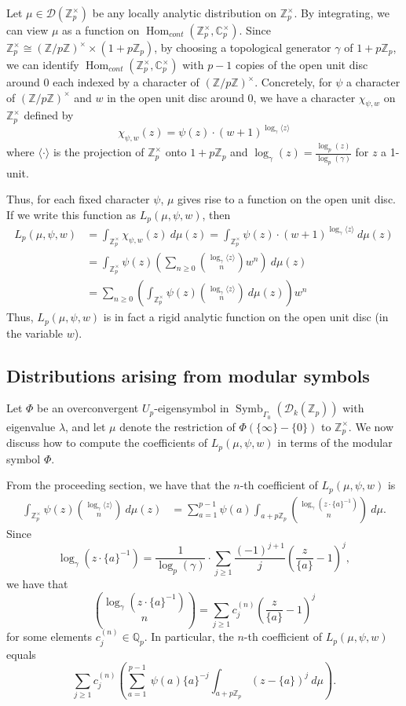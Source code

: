 \documentclass{amsart}
\theoremstyle{plain}
\theoremstyle{definition}
\newcommand{\D}{{\mathcal D}}
\newcommand{\Z}{{\mathbb Z}}
\newcommand{\Q}{{\mathbb Q}}
\newcommand{\C}{{\mathbb C}}
\newcommand{\Zp}{\Z_p}
\newcommand{\Zpx}{\Z_p^\times}
\newcommand{\Cpx}{\C_p^\times}
\newcommand{\Qp}{\Q_p}
\renewcommand{\binom}[2]{\genfrac{(}{)}{0pt}{}{#1}{#2}}
\newcommand{\Dvla}[1]{\D_{#1}(\Zp)}
\newcommand{\Dkla}{\Dvla{k}}
\DeclareMathOperator{\Hom}{Hom}
\DeclareMathOperator{\Symb}{Symb}
\newcommand{\MSo}[1]{\Symb_{\Gamma_0}(#1)}
\begin{document}
Let $\mu \in \D(\Zpx)$ be any locally analytic distribution on $\Zpx$.  By integrating, we can view $\mu$ as a function on $\Hom_{cont}(\Zpx,\Cpx)$.  Since $\Zpx \cong (\Z/p\Z)^\times \times (1+p\Zp)$, by choosing a topological generator $\gamma$ of $1+p\Zp$, we can identify $\Hom_{cont}(\Zpx,\Cpx)$ with $p-1$ copies of the open unit disc around $0$ each indexed by a character of $(\Z/p\Z)^\times$.  Concretely, for $\psi$ a character of $(\Z/p\Z)^\times$ and $w$ in the open unit disc around $0$, we have a character $\chi_{\psi,w}$ on $\Zpx$ defined by
$$
\chi_{\psi,w}(z) = \psi(z) \cdot (w+1)^{\log_\gamma \langle z \rangle}
$$
where $\langle \cdot \rangle$ is the projection of $\Zpx$ onto $1+p\Zp$ and $\log_\gamma(z) = \frac{\log_p(z)}{\log_p(\gamma)}$ for $z$ a 1-unit.

Thus, for each fixed character $\psi$, $\mu$ gives rise to a function on the open unit disc.  If we write this function as $L_p(\mu,\psi,w)$, then 
\begin{align*}
L_p(\mu,\psi,w) 
&= \int_{\Zpx} \chi_{\psi,w}(z) ~d \mu(z) 
= \int_{\Zpx}  \psi(z) \cdot (w+1)^{\log_\gamma \langle z \rangle} ~d \mu(z) \\
&= \int_{\Zpx} \psi(z) \left( \sum_{n \geq 0} \binom{\log_\gamma \langle z \rangle}{n} w^n \right) ~d \mu(z)  \\
&= \sum_{n \geq 0}  \left( \int_{\Zpx} \psi(z)   \binom{\log_\gamma \langle z \rangle}{n} ~d \mu(z) \right) w^n   
\end{align*}
Thus, $L_p(\mu,\psi,w)$ is in fact a rigid analytic function on the open unit disc (in the variable $w$).  

\subsection{Distributions arising from modular symbols}

Let $\Phi$ be an overconvergent $U_p$-eigensymbol in $\MSo{\Dkla}$ with eigenvalue $\lambda$, and let $\mu$ denote the restriction of $\Phi(\{ \infty \} - \{ 0 \})$ to $\Zpx$.
We now discuss how to compute the coefficients of $L_p(\mu,\psi,w)$ in terms of the modular symbol $\Phi$. 

From the proceeding section, we have that the $n$-th coefficient of $L_p(\mu,\psi,w)$ is
\begin{align*}
\int_{\Zpx} \psi(z)   \binom{\log_\gamma \langle z \rangle}{n} ~d \mu(z)
&= \sum_{a=1}^{p-1} \psi(a) \int_{a+p\Zp} \binom{\log_\gamma\left(z \cdot \{a\}^{-1}\right)}{n} ~d \mu.
\end{align*}
Since 
$$
\log_\gamma\left(z \cdot \{a\}^{-1}\right) = \frac{1}{\log_p(\gamma)} \cdot \sum_{j \geq 1} \frac{(-1)^{j+1}}{j} \left(   \frac{z}{\{a\}} -1  \right)^j,
$$
we have that
$$
\binom{\log_\gamma\left(z \cdot \{a\}^{-1}\right)}{n} = \sum_{j \geq 1} c_j^{(n)} \left(   \frac{z}{\{a\}} -1  \right)^j
$$
for some elements $c_j^{(n)} \in \Qp$.  In particular, the $n$-th coefficient of $L_p(\mu,\psi,w)$ equals
\begin{equation}
\label{eqn:coef}
\sum_{j \geq 1} c_j^{(n)} \left( \sum_{a=1}^{p-1} ~\psi(a) \{a\}^{-j} \int_{a+p\Zp} \left(z - \{a\} \right)^j ~d\mu \right).
\end{equation}
\end{document}
